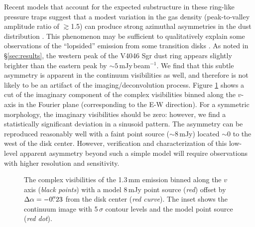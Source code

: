 {Recent models that account for the expected substructure in these ring-like 
pressure traps suggest that a modest variation in the gas density 
(peak-to-valley amplitude ratio of $\gtrsim$1.5) can produce strong azimuthal 
asymmetries in the dust distribution \citep{regaly12,birnstiel13}.  This 
phenomenon may be sufficient to qualitatively explain some observations of the 
``lopsided'' emission from some transition disks \citep[e.g.][]{brown09,
mayama12,casassus13,vandermarel13}.  As noted in \S\ref{sec:results}, the western peak of the 
V4046 Sgr dust ring appears slightly brighter than the eastern peak by 
$\sim 5$\,mJy\,beam$^{-1}$.  We find that this subtle asymmetry is apparent in 
the continuum visibilities as well, and therefore is not likely to be an 
artifact of the imaging/deconvolution process.  Figure \ref{fig:asym} shows a 
cut of the imaginary component of the complex visibilities binned along the 
$v$-axis in the Fourier plane (corresponding to the E-W direction).  For a 
symmetric morphology, the imaginary visibilities should be zero: however, we 
find a statistically significant deviation in a sinusoid pattern.  The 
asymmetry can be reproduced reasonably well with a faint point source 
($\sim$8\,mJy) located $\sim$0 to the west of the disk center.  However,
verification and characterization of this low-level apparent asymmetry beyond 
such a simple model will require observations with higher resolution and 
sensitivity.

\begin{figure}[t!]
\caption{ The complex visibilities of the 1.3\,mm emission binned along the 
$v$ axis ({\it black points}) with a model 8\,mJy point source ({\it red}) 
offset by $\Delta \alpha = -0\mbox{$.\!\!^{\prime\prime}$}23$ from the disk center ({\it red curve}).  
The inset shows the continuum image with 5\,$\sigma$ contour levels and the 
model point source ({\it red dot}).
\label{fig:asym}}
\end{figure}

}

